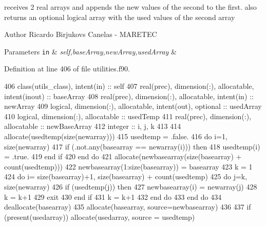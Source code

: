 receives 2 real arrays and appends the new values of the second to the first. also returns an optional logical array with the used values of the second array 

\begin{DoxyAuthor}{Author}
Ricardo Birjukovs Canelas -\/ M\+A\+R\+E\+T\+EC 
\end{DoxyAuthor}

\begin{DoxyParams}[1]{Parameters}
\mbox{\tt in}  & {\em self,base\+Array,new\+Array,used\+Array} & \\
\hline
\end{DoxyParams}


Definition at line 406 of file utilities.\+f90.


\begin{DoxyCode}
406     \textcolor{keywordtype}{class}(utils\_class), \textcolor{keywordtype}{intent(in)} :: self
407     \textcolor{keywordtype}{real(prec)}, \textcolor{keywordtype}{dimension(:)}, \textcolor{keywordtype}{allocatable}, \textcolor{keywordtype}{intent(inout)} :: baseArray
408     \textcolor{keywordtype}{real(prec)}, \textcolor{keywordtype}{dimension(:)}, \textcolor{keywordtype}{allocatable}, \textcolor{keywordtype}{intent(in)} :: newArray
409     \textcolor{keywordtype}{logical}, \textcolor{keywordtype}{dimension(:)}, \textcolor{keywordtype}{allocatable}, \textcolor{keywordtype}{intent(out)}, \textcolor{keywordtype}{optional} :: usedArray
410     \textcolor{keywordtype}{logical}, \textcolor{keywordtype}{dimension(:)}, \textcolor{keywordtype}{allocatable} :: usedTemp
411     \textcolor{keywordtype}{real(prec)}, \textcolor{keywordtype}{dimension(:)}, \textcolor{keywordtype}{allocatable} :: newBaseArray
412     \textcolor{keywordtype}{integer} :: i, j, k
413 
414     \textcolor{keyword}{allocate}(usedtemp(\textcolor{keyword}{size}(newarray)))
415     usedtemp = .false.
416     \textcolor{keywordflow}{do} i=1, \textcolor{keyword}{size}(newarray)
417         \textcolor{keywordflow}{if} (.not.any(basearray == newarray(i))) \textcolor{keywordflow}{then}
418             usedtemp(i) = .true.
419 \textcolor{keywordflow}{        end if}
420 \textcolor{keywordflow}{    end do}
421     \textcolor{keyword}{allocate}(newbasearray(\textcolor{keyword}{size}(basearray) + count(usedtemp)))
422     newbasearray(1:\textcolor{keyword}{size}(basearray)) = basearray
423     k = 1
424     \textcolor{keywordflow}{do} i= \textcolor{keyword}{size}(basearray)+1, \textcolor{keyword}{size}(basearray) + count(usedtemp)
425         \textcolor{keywordflow}{do} j=k, \textcolor{keyword}{size}(newarray)
426             \textcolor{keywordflow}{if} (usedtemp(j)) \textcolor{keywordflow}{then}
427                 newbasearray(i) =  newarray(j)
428                 k = k+1
429                 \textcolor{keywordflow}{exit}
430 \textcolor{keywordflow}{            end if}
431             k = k+1
432 \textcolor{keywordflow}{        end do}
433 \textcolor{keywordflow}{    end do}
434     \textcolor{keyword}{deallocate}(basearray)
435     \textcolor{keyword}{allocate}(basearray, source=newbasearray)
436 
437     \textcolor{keywordflow}{if} (\textcolor{keyword}{present}(usedarray)) \textcolor{keyword}{allocate}(usedarray, source = usedtemp)
\end{DoxyCode}
